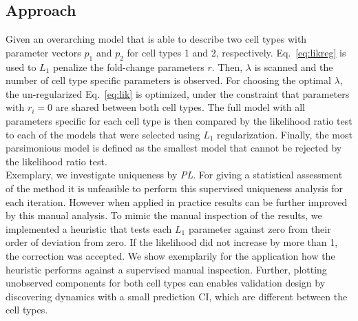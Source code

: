 \documentclass{bioinfo}
\begin{document}
\begin{methods}
\section{Approach}
Given an overarching model that is able to describe two cell types with parameter vectors $p_1$ and $p_2$ for cell types 1 and 2, respectively.
Eq.~\ref{eq:likreg} is used to $L_1$ penalize the fold-change parameters $r$.
Then, $\lambda$ is scanned and the number of cell type specific parameters is observed.
For choosing the optimal $\lambda$, the un-regularized Eq.~\ref{eq:lik} is optimized, under the constraint that parameters with $r_i = 0$ are shared between both cell types.
The full model with all parameters specific for each cell type is then compared by the likelihood ratio test to each of the models that were selected using $L_1$ regularization.
Finally, the most parsimonious model is defined as the smallest model that cannot be rejected by the likelihood ratio test.\\
Exemplary, we investigate uniqueness by \emph{PL}.
For giving a statistical assessment of the method it is unfeasible to perform this supervised uniqueness analysis for each iteration.
However when applied in practice results can be further improved by this manual analysis.
To mimic the manual inspection of the results, we implemented a heuristic that tests each $L_1$ parameter against zero from their order of deviation from zero.
If the likelihood did not increase by more than 1, the correction was accepted.
We show exemplarily for the application how the heuristic performs against a supervised manual inspection.
Further, plotting unobserved components for both cell types can enables validation design by discovering dynamics with a small prediction CI, which are different between the cell types.


\end{methods}
\end{document}
